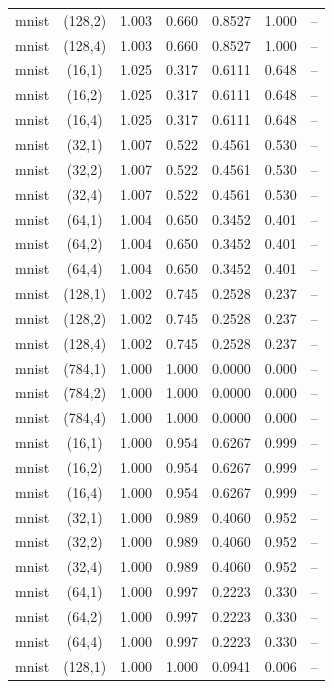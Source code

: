 \begin{tabular}{lcccccc}
mnist & (128,2) & 1.003 & 0.660 & 0.8527 & 1.000 & -- \\
mnist & (128,4) & 1.003 & 0.660 & 0.8527 & 1.000 & -- \\
mnist & (16,1) & 1.025 & 0.317 & 0.6111 & 0.648 & -- \\
mnist & (16,2) & 1.025 & 0.317 & 0.6111 & 0.648 & -- \\
mnist & (16,4) & 1.025 & 0.317 & 0.6111 & 0.648 & -- \\
mnist & (32,1) & 1.007 & 0.522 & 0.4561 & 0.530 & -- \\
mnist & (32,2) & 1.007 & 0.522 & 0.4561 & 0.530 & -- \\
mnist & (32,4) & 1.007 & 0.522 & 0.4561 & 0.530 & -- \\
mnist & (64,1) & 1.004 & 0.650 & 0.3452 & 0.401 & -- \\
mnist & (64,2) & 1.004 & 0.650 & 0.3452 & 0.401 & -- \\
mnist & (64,4) & 1.004 & 0.650 & 0.3452 & 0.401 & -- \\
mnist & (128,1) & 1.002 & 0.745 & 0.2528 & 0.237 & -- \\
mnist & (128,2) & 1.002 & 0.745 & 0.2528 & 0.237 & -- \\
mnist & (128,4) & 1.002 & 0.745 & 0.2528 & 0.237 & -- \\
mnist & (784,1) & 1.000 & 1.000 & 0.0000 & 0.000 & -- \\
mnist & (784,2) & 1.000 & 1.000 & 0.0000 & 0.000 & -- \\
mnist & (784,4) & 1.000 & 1.000 & 0.0000 & 0.000 & -- \\
mnist & (16,1) & 1.000 & 0.954 & 0.6267 & 0.999 & -- \\
mnist & (16,2) & 1.000 & 0.954 & 0.6267 & 0.999 & -- \\
mnist & (16,4) & 1.000 & 0.954 & 0.6267 & 0.999 & -- \\
mnist & (32,1) & 1.000 & 0.989 & 0.4060 & 0.952 & -- \\
mnist & (32,2) & 1.000 & 0.989 & 0.4060 & 0.952 & -- \\
mnist & (32,4) & 1.000 & 0.989 & 0.4060 & 0.952 & -- \\
mnist & (64,1) & 1.000 & 0.997 & 0.2223 & 0.330 & -- \\
mnist & (64,2) & 1.000 & 0.997 & 0.2223 & 0.330 & -- \\
mnist & (64,4) & 1.000 & 0.997 & 0.2223 & 0.330 & -- \\
mnist & (128,1) & 1.000 & 1.000 & 0.0941 & 0.006 & -- \\

\end{tabular}
